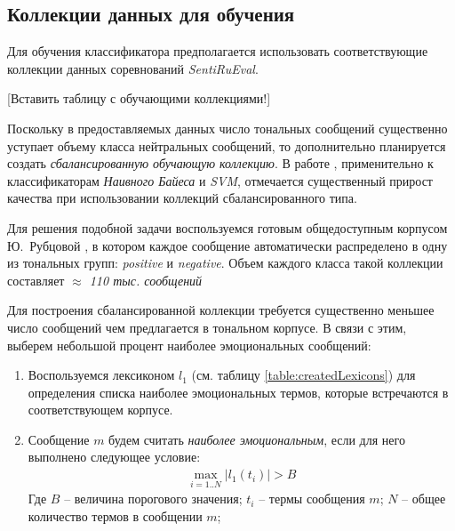 \subsection{Коллекции данных для обучения}
    Для обучения классификатора предполагается использовать соответствующие
    коллекции данных соревнований {\it SentiRuEval}.

    [Вставить таблицу с обучающими коллекциями!]

    Поскольку в предоставляемых
    данных число тональных сообщений существенно уступает объему класса
    нейтральных сообщений, то дополнительно планируется создать {\it сбалансированную
    обучающую коллекцию}.
    В работе \cite{diploma2015}, применительно к классификаторам {\it
    Наивного Байеса} и {\it SVM}, отмечается существенный прирост качества при
    использовании коллекций сбалансированного типа.

    Для решения подобной задачи воспользуемся готовым общедоступным корпусом Ю.~Рубцовой
    \cite{rubtsovaCollection}, в
    котором каждое сообщение автоматически распределено в одну из тональных групп:
    {\it positive} и {\it negative}.
    Объем каждого класса такой коллекции составляет {\it $\approx$ 110 тыс.
    сообщений}

    Для построения сбалансированной коллекции требуется существенно меньшее
    число сообщений чем предлагается в тональном корпусе.
    В связи с этим, выберем небольшой процент наиболее эмоциональных сообщений:
    \begin{enumerate}
        \item Воспользуемся лексиконом $l_1$ (см. таблицу \ref{table:createdLexicons})
        для определения списка наиболее эмоциональных термов, которые встречаются
        в соответствующем корпусе.
        \item Сообщение $m$ будем считать {\it наиболее эмоциональным},
        если для него выполнено следующее условие:
        \begin{gather}
            \max\limits_{i=1..N} |l_1(t_i)| > B
        \end{gather}
        Где $B$ -- величина порогового значения; \hspace{0.5pt} $t_i$ -- термы сообщения $m$;
        \hspace{0.5pt} $N$ -- общее количество термов в сообщении $m$;
    \end{enumerate}
